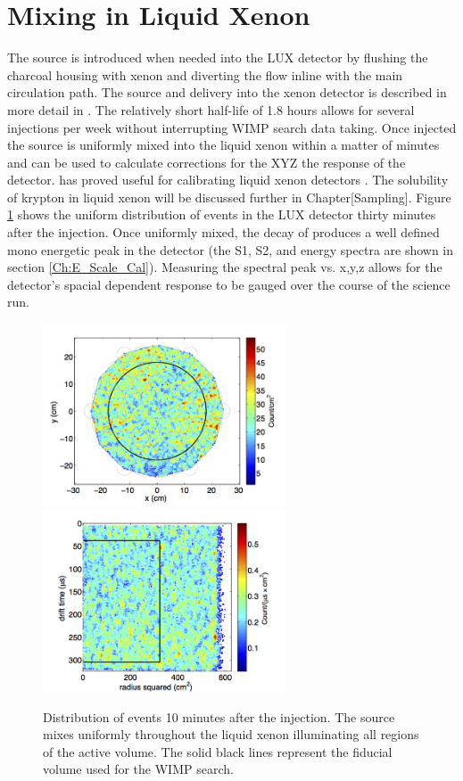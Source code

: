 \newpage

\section{\KrCal Mixing in Liquid Xenon}

The \KrCal source is introduced when needed into the LUX detector by flushing the charcoal housing with xenon and diverting the flow inline with the main circulation path. The \KrCal source and delivery into the xenon detector is described in more detail in \cite{Kastens}. The relatively short half-life of 1.8 hours allows for several injections per week without interrupting WIMP search data taking. Once injected the source is uniformly mixed into the liquid xenon within a matter of minutes and can be used to calculate corrections for the XYZ the response of the detector. \KrCal has proved useful for calibrating liquid xenon detectors \cite{Kastens} \cite{Baudis} \cite{Aprile_LY}. The solubility of krypton in liquid xenon will be discussed further in Chapter[Sampling].  Figure \ref{fig:Kr_Dist} shows the uniform distribution of \KrCal events in the LUX detector thirty minutes after the injection. Once uniformly mixed, the decay of \KrCal produces a well defined mono energetic peak in the detector (the S1, S2, and energy spectra are shown in section \ref{Ch:E_Scale_Cal}). Measuring the spectral peak vs. x,y,z allows for the detector's spacial dependent response to be gauged over the course of the science run.

\begin{figure}[h!]\centering
\includegraphics[width=72mm]{Chapter_XYZ_Corr/Thesis_Corr_Plots/Kr_XY_density.png}
\includegraphics[width=72mm]{Chapter_XYZ_Corr/Thesis_Corr_Plots/Kr_RZ_density.png}
\caption{Distribution of \KrCal events 10 minutes after the injection. The source mixes uniformly throughout the liquid xenon illuminating all regions of the active volume. The solid black lines represent the fiducial volume used for the WIMP search. }
\label{fig:Kr_Dist}
\end{figure}


